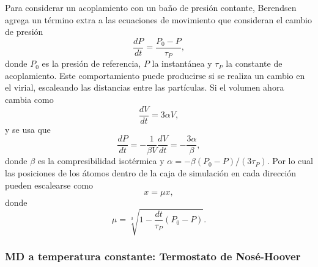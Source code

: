 Para considerar un acoplamiento con un baño de presión contante, Berendsen 
\cite{berendsen1984} agrega un término extra a las ecuaciones de movimiento que
consideran el cambio de presión
\begin{equation*}
\frac{dP}{dt} = \frac{P_0 - P}{\tau_P},
\end{equation*}
donde $P_0$ es la presión de referencia, $P$ la instantánea y $\tau_P$ la 
constante de acoplamiento. Este comportamiento puede producirse si se realiza un
cambio en el virial, escaleando las distancias entre las partículas. Si el 
volumen ahora cambia como 
\begin{equation*}
\frac{dV}{dt} = 3 \alpha V,
\end{equation*}
y se usa que
\begin{equation*}
\frac{dP}{dt} = - \frac{1}{\beta V} \frac{dV}{dt} = -\frac{3\alpha}{\beta},
\end{equation*}
donde $\beta$ es la compresibilidad isotérmica y $\alpha = - \beta (P_0 - P) / (3 \tau_P)$.
Por lo cual las posiciones de los átomos dentro de la caja de simulación en cada
dirección pueden escalearse como
\begin{equation*}
x = \mu x,
\end{equation*}
donde
\begin{equation*}
\mu = \sqrt[3]{1 - \frac{dt}{\tau_P} (P_0 - P)}.
\end{equation*}

\subsubsection{MD a temperatura constante: Termostato de Nosé-Hoover}


